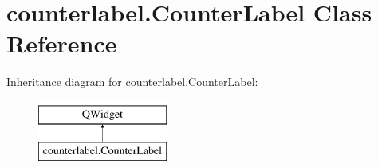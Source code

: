 \hypertarget{classcounterlabel_1_1CounterLabel}{}\section{counterlabel.\+Counter\+Label Class Reference}
\label{classcounterlabel_1_1CounterLabel}
Inheritance diagram for counterlabel.\+Counter\+Label\+:\begin{figure}[H]
\begin{center}
\leavevmode
\includegraphics[height=2.000000cm]{classcounterlabel_1_1CounterLabel}
\end{center}
\end{figure}
